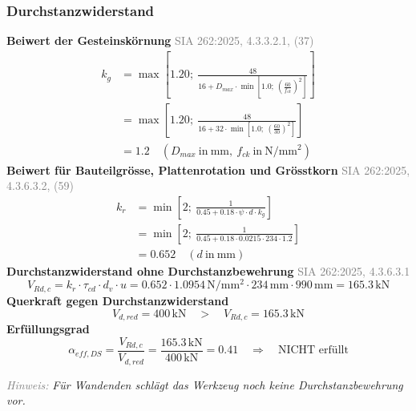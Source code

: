 \documentclass[11pt,a4paper]{article}
\newcommand{\normref}[1]{{\small\textcolor{gray}{#1}}}
\newcommand{\hinweis}[2]{\par\noindent\textcolor{gray}{\textit{#1:}} \textit{#2}\par}
\begin{document}
\subsubsection{Durchstanzwiderstand}
\noindent\textbf{Beiwert der Gesteinskörnung} \hfill \normref{SIA 262:2025, 4.3.3.2.1, (37)}
\begin{equation*}
\begin{aligned}
  k_g &= \max\left[1.20;\ \frac{48}{16 + D_{max} \cdot \min\left[1.0;\ \left(\frac{60}{f_{ck}}\right)^{2}\right]}\right] \\
  &= \max\left[1.20;\ \frac{48}{16 + 32 \cdot \min\left[1.0;\ \left(\frac{60}{30}\right)^{2}\right]}\right] \\
  &= 1.2 \quad \left(D_{max}\ \text{in}\ \mathrm{mm},\ f_{ck}\ \text{in}\ \mathrm{N}/\mathrm{mm}^{2}\right)
\end{aligned}
\end{equation*}
\noindent\textbf{Beiwert für Bauteilgrösse, Plattenrotation und Grösstkorn} \hfill \normref{SIA 262:2025, 4.3.6.3.2, (59)}
\begin{equation*}
\begin{aligned}
  k_r &= \min\left[2;\ \frac{1}{0.45 + 0.18 \cdot \psi \cdot d \cdot k_g}\right] \\
  &= \min\left[2;\ \frac{1}{0.45 + 0.18 \cdot 0.0215 \cdot 234 \cdot 1.2}\right] \\
  &= 0.652 \quad \left(d\ \text{in}\ \mathrm{mm}\right)
\end{aligned}
\end{equation*}
\noindent\textbf{Durchstanzwiderstand ohne Durchstanzbewehrung} \hfill \normref{SIA 262:2025, 4.3.6.3.1}
\begin{equation*}
V_{Rd,c} = k_r \cdot \tau_{cd} \cdot d_v \cdot u = 0.652 \cdot 1.0954\,\mathrm{N}/\mathrm{mm}^{2} \cdot 234\,\mathrm{mm} \cdot 990\,\mathrm{mm} = 165.3\,\mathrm{kN}
\end{equation*}
\noindent\textbf{Querkraft gegen Durchstanzwiderstand}
\begin{equation*}
V_{d,red} = 400\,\mathrm{kN} \quad > \quad V_{Rd,c} = 165.3\,\mathrm{kN}
\end{equation*}
\noindent\textbf{Erfüllungsgrad}
\begin{equation*}
\alpha_{eff,DS} = \frac{V_{Rd,c}}{V_{d,red}} = \frac{165.3\,\mathrm{kN}}{400\,\mathrm{kN}} = 0.41 \quad \Rightarrow \quad \text{NICHT erfüllt}
\end{equation*}
\hinweis{Hinweis}{Für Wandenden schlägt das Werkzeug noch keine Durchstanzbewehrung vor.}
\end{document}
